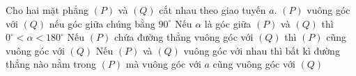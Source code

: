 \begin{ex}%
 Cho hai mặt phẳng $(P)$ và $(Q)$  cắt nhau theo giao tuyến $a$.
 \choiceTF 
   {\True $(P)$ vuông góc với $(Q)$ nếu góc giữa chúng bằng $90^{\circ}$}
  {Nếu $\alpha $ là  góc giữa $(P)$ và $(Q)$ thì $0^{\circ}<\alpha <180^{\circ}$}
  {\True Nếu $(P)$ chứa đường thẳng vuông góc với $(Q)$ thì $(P)$ cũng vuông  góc với $(Q)$}
  {\True Nếu $(P)$ và $(Q)$ vuông góc với nhau thì bất kì đường thẳng nào nằm trong  $(P)$ mà vuông góc với $a$ cũng vuông góc với $(Q)$}
\end{ex}

